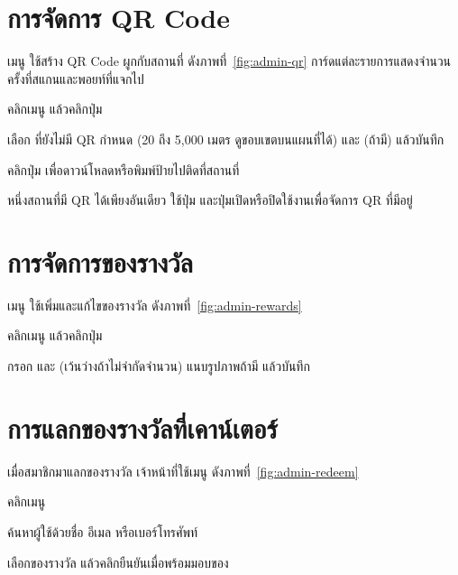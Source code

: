\section{การจัดการ QR Code}

เมนู  ใช้สร้าง QR Code ผูกกับสถานที่ ดังภาพที่~\ref{fig:admin-qr} การ์ดแต่ละรายการแสดงจำนวนครั้งที่สแกนและพอยท์ที่แจกไป


\begin{steps}
  \item คลิกเมนู  แล้วคลิกปุ่ม 
  \item เลือก  ที่ยังไม่มี QR กำหนด   (20 ถึง 5,000 เมตร ดูขอบเขตบนแผนที่ได้) และ  (ถ้ามี) แล้วบันทึก
  \item คลิกปุ่ม  เพื่อดาวน์โหลดหรือพิมพ์ป้ายไปติดที่สถานที่
\end{steps}

หนึ่งสถานที่มี QR ได้เพียงอันเดียว ใช้ปุ่ม  และปุ่มเปิดหรือปิดใช้งานเพื่อจัดการ QR ที่มีอยู่

\section{การจัดการของรางวัล}

เมนู  ใช้เพิ่มและแก้ไขของรางวัล ดังภาพที่~\ref{fig:admin-rewards}


\begin{steps}
  \item คลิกเมนู  แล้วคลิกปุ่ม 
  \item กรอก   และ  (เว้นว่างถ้าไม่จำกัดจำนวน) แนบรูปภาพถ้ามี แล้วบันทึก
\end{steps}

\section{การแลกของรางวัลที่เคาน์เตอร์}
\label{sec:admin-redeem}

เมื่อสมาชิกมาแลกของรางวัล เจ้าหน้าที่ใช้เมนู  ดังภาพที่~\ref{fig:admin-redeem}


\begin{steps}
  \item คลิกเมนู 
  \item ค้นหาผู้ใช้ด้วยชื่อ อีเมล หรือเบอร์โทรศัพท์
  \item เลือกของรางวัล แล้วคลิกยืนยันเมื่อพร้อมมอบของ
\end{steps}

